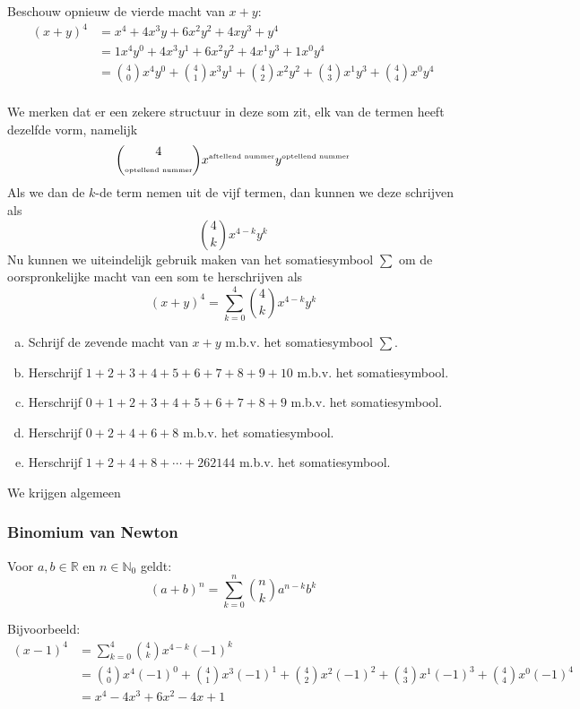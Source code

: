 \documentclass[12pt,a4paper,twoside]{article}
\begin{document}
Beschouw opnieuw de vierde macht van $x+y$:
\begin{align*}
  (x+y)^4 &= x^4 + 4x^3y+6x^2y^2+4xy^3+y^4\\
          &= 1x^4y^0 + 4x^3y^1+6x^2y^2+4x^1y^3+1x^0y^4\\
          &= {4 \choose 0}x^4y^0 + {4 \choose 1}x^3y^1+{4 \choose 2}x^2y^2+{4 \choose 3}x^1y^3+{4 \choose 4}x^0y^4\\
\end{align*}

We merken dat er een zekere structuur in deze som zit, elk van de termen heeft dezelfde vorm, namelijk
\[{4 \choose \mbox{\tiny{optellend nummer}}}x^{\mbox{{\tiny aftellend nummer}}}y^{\mbox{{\tiny optellend nummer}}}\]
Als we dan de $k$-de term nemen uit de vijf termen, dan kunnen we deze schrijven als
\[{4 \choose k}x^{4-k}y^{k}\]
Nu kunnen we uiteindelijk gebruik maken van het somatiesymbool $\sum$ om de oorspronkelijke macht van een som te herschrijven als
\[\left(x+y\right)^4 = \sum^4_{k=0}{4 \choose k}x^{4-k}y^{k}\]

\begin{oefening}
\begin{enumerate}[(a)]
\item Schrijf de zevende macht van $x+y$ m.b.v. het somatiesymbool
  $\sum$.
\item Herschrijf $1 + 2 + 3 + 4 + 5 + 6 + 7 + 8 + 9 + 10$ m.b.v. het somatiesymbool.
\item Herschrijf $0 + 1 + 2 + 3 + 4 + 5 + 6 + 7 + 8 + 9$ m.b.v. het somatiesymbool.
\item Herschrijf $0 + 2 + 4 + 6 + 8$ m.b.v. het somatiesymbool.
\item Herschrijf $1 + 2 + 4 + 8 + \cdots + 262144$ m.b.v. het somatiesymbool.
\end{enumerate}
\end{oefening}

\needspace{5cm}
We krijgen algemeen
\subsubsection{Binomium van Newton}
\begin{mdframed}
Voor $a,b\in\mathbb{R}$ en $n\in\mathbb{N}_0$ geldt:
$$(a+b)^n=\sum^n_{k=0}{n \choose k}a^{n-k}b^k$$
\end{mdframed}

Bijvoorbeeld:
\begin{align*}\displaystyle
  (x-1)^4 &= \sum^4_{k=0}{4 \choose k}x^{4-k}(-1)^k\\
          &= {4 \choose 0}x^4(-1)^0 + {4 \choose 1}x^3(-1)^1+{4 \choose 2}x^2(-1)^2+{4 \choose 3}x^1(-1)^3+{4 \choose 4}x^0(-1)^4\\
          &=x^4-4x^3+6x^2-4x+1
\end{align*}
\end{document}
